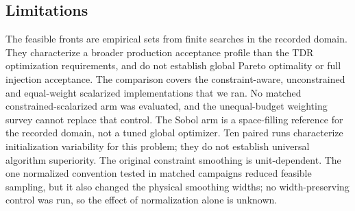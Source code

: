 \documentclass[aps,prab,reprint,superscriptaddress,amsmath,amssymb,floatfix]{revtex4-2}
\begin{document}
\subsection{Limitations}
The feasible fronts are empirical sets from finite searches in the recorded domain. They
characterize a broader production acceptance profile than the TDR optimization requirements,
and do not establish global Pareto optimality or full injection acceptance. The comparison covers
the constraint-aware, unconstrained and equal-weight scalarized
implementations that we ran. No matched constrained-scalarized arm was evaluated, and the unequal-budget
weighting survey cannot replace that control. The Sobol arm is a space-filling reference for
the recorded domain, not a tuned global optimizer. Ten paired runs
characterize initialization variability for this problem; they do not establish universal
algorithm superiority. The original constraint smoothing is unit-dependent. The one
normalized convention tested in matched campaigns reduced feasible sampling, but it also
changed the physical smoothing widths; no width-preserving control was run, so the effect of
normalization alone is unknown.
\end{document}
